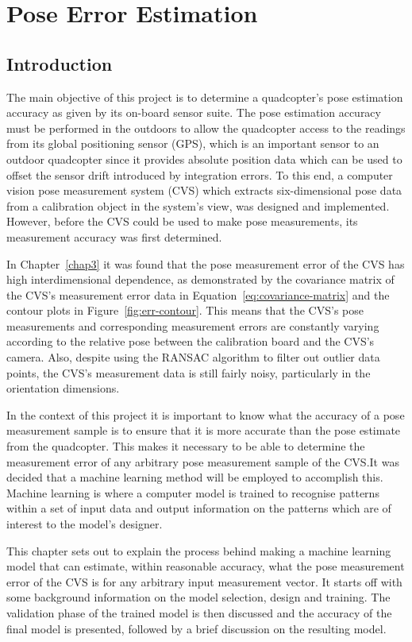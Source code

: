 \chapter{Pose Error Estimation}
\label{chap4}

\section{Introduction}

The main objective of this project is to determine a quadcopter's pose estimation accuracy as given by its on-board sensor suite. The pose estimation accuracy must be performed in the outdoors to allow the quadcopter access to the readings from its global positioning sensor (GPS), which is an important sensor to an outdoor quadcopter since it provides absolute position data which can be used to offset the sensor drift introduced by integration errors. To this end, a computer vision pose measurement system (CVS) which extracts six-dimensional pose data from a calibration object in the system's view, was designed and implemented. However, before the CVS could be used to make pose measurements, its measurement accuracy was first determined. 

In Chapter~\ref{chap3} it was found that the pose measurement error of the CVS has high interdimensional dependence, as demonstrated by the covariance matrix of the CVS's measurement error data in Equation~\ref{eq:covariance-matrix} and the contour plots in Figure~\ref{fig:err-contour}. This means that the CVS's pose measurements and corresponding measurement errors are constantly varying according to the relative pose between the calibration board and the CVS's camera. Also, despite using the RANSAC algorithm to filter out outlier data points, the CVS's measurement data is still fairly noisy, particularly in the orientation dimensions.

In the context of this project it is important to know what the accuracy of a pose measurement sample is to ensure that it is more accurate than the pose estimate from the quadcopter. This makes it necessary to be able to determine the measurement error of any arbitrary pose measurement sample of the CVS.\@ It was decided that a machine learning method will be employed to accomplish this. Machine learning is where a computer model is trained to recognise patterns within a set of input data and output information on the patterns which are of interest to the model's designer. 

This chapter sets out to explain the process behind making a machine learning model that can estimate, within reasonable accuracy, what the pose measurement error of the CVS is for any arbitrary input measurement vector. It starts off with some background information on the model selection, design and training. The validation phase of the trained model is then discussed and the accuracy of the final model is presented, followed by a brief discussion on the resulting model. 

